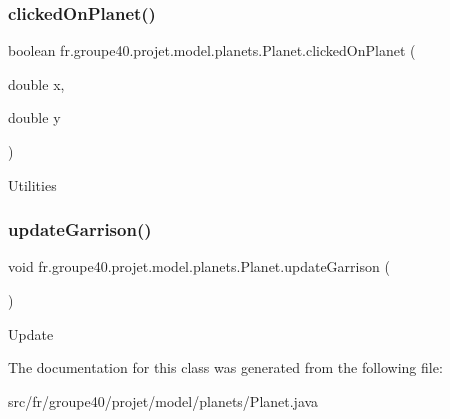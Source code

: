 \subsubsection{\texorpdfstring{clicked\+On\+Planet()}{clickedOnPlanet()}}
{\footnotesize\ttfamily boolean fr.\+groupe40.\+projet.\+model.\+planets.\+Planet.\+clicked\+On\+Planet (\begin{DoxyParamCaption}\item[{double}]{x,  }\item[{double}]{y }\end{DoxyParamCaption})}

Utilities \mbox{\label{classfr_1_1groupe40_1_1projet_1_1model_1_1planets_1_1_planet_a6db5bb259c3c2889b0285b0472fc6a76}} 
\subsubsection{\texorpdfstring{update\+Garrison()}{updateGarrison()}}
{\footnotesize\ttfamily void fr.\+groupe40.\+projet.\+model.\+planets.\+Planet.\+update\+Garrison (\begin{DoxyParamCaption}{ }\end{DoxyParamCaption})}

Update 

The documentation for this class was generated from the following file\+:\begin{DoxyCompactItemize}
\item 
src/fr/groupe40/projet/model/planets/Planet.\+java\end{DoxyCompactItemize}
